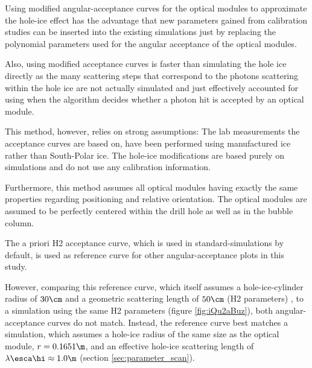 Using modified angular-acceptance curves for the optical modules to approximate the hole-ice effect has the advantage that new parameters gained from calibration studies can be inserted into the existing simulations just by replacing the polynomial parameters used for the angular acceptance of the optical modules.

Also, using modified acceptance curves is faster than simulating the hole ice directly as the many scattering steps that correspond to the photons scattering within the hole ice are not actually simulated and just effectively accounted for using when the algorithm decides whether a photon hit is accepted by an optical module.

This method, however, relies on strong assumptions: The lab measurements the acceptance curves are based on, have been performed using manufactured ice rather than South-Polar ice. The hole-ice modifications are based purely on simulations and do not use any \icecube calibration information. \cite{icepaper}

Furthermore, this method assumes all optical modules having exactly the same properties regarding positioning and relative orientation. The optical modules are assumed to be perfectly centered within the drill hole as well as in the bubble column.

The a priori H2 acceptance curve, which is used in standard-\clsim simulations by default, is used as reference curve for other angular-acceptance plots in this study.

However, comparing this reference curve, which itself assumes a hole-ice-cylinder radius of $30\cm$ and a geometric scattering length of $50\cm$ (H2 parameters) \cite{icemodelsdata}, to a \clsim simulation using the same H2 parameters (figure \ref{fig:iQu2aBuz}), both angular-acceptance curves do not match. Instead, the reference curve best matches a \clsim simulation, which assumes a hole-ice radius of the same size as the optical module, $r = 0.1651\m$, and an effective hole-ice scattering length of $\lambda\esca\hi \approx 1.0\m$ (section \ref{sec:parameter_scan}).

